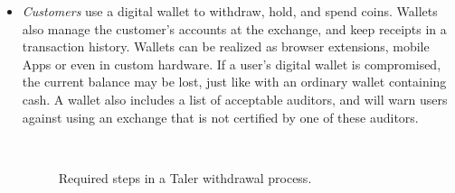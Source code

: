 \documentclass{llncs}
\begin{document}
\begin{itemize}
\item
{\em Customers} use a digital wallet to withdraw,
hold, and spend coins. Wallets also manage the customer's accounts
at the exchange, and keep receipts in a transaction history.  Wallets can be
realized as browser extensions, mobile Apps or even in custom
hardware.  If a user's digital wallet is compromised, the current
balance may be lost, just like with an ordinary wallet containing cash.
A wallet also includes a list of acceptable auditors, and will warn
users against using an exchange that is not certified by one of these
auditors.

\begin{figure}[t!]%
 \hfill
{} \\
 \hfill
{}
\caption{Required steps in a Taler withdrawal process.}
\label{fig:withdrawal}
\end{figure}




\end{itemize}
\end{document}
